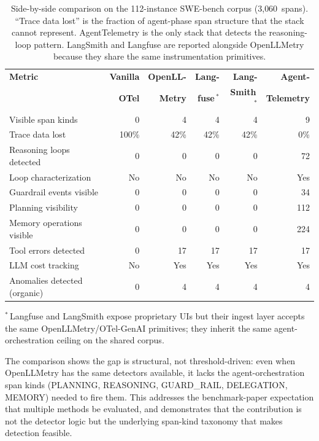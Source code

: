 \documentclass[sigconf,screen]{acmart}
\begin{document}
\begin{table}[t]
\centering
\scriptsize
\caption{Side-by-side comparison on the 112-instance SWE-bench corpus
(3{,}060~spans).  ``Trace data lost'' is the fraction of agent-phase
span structure that the stack cannot represent.  AgentTelemetry is the
only stack that detects the reasoning-loop pattern.  LangSmith and
Langfuse are reported alongside OpenLLMetry because they share the
same instrumentation primitives.}
\label{tab:headtohead}
\begin{tabular}{@{}lrrrrr@{}}
\toprule
\textbf{Metric} & \textbf{Vanilla} & \textbf{OpenLL-} & \textbf{Lang-} & \textbf{Lang-} & \textbf{Agent-} \\
                & \textbf{OTel}    & \textbf{Metry}   & \textbf{fuse}\,$^{\ast}$ & \textbf{Smith}\,$^{\ast}$ & \textbf{Telemetry} \\
\midrule
Visible span kinds                & 0    & 4    & 4    & 4    & 9    \\
Trace data lost                   & 100\% & 42\% & 42\% & 42\% & 0\%  \\
Reasoning loops detected          & 0    & 0    & 0    & 0    & 72   \\
Loop characterization             & No   & No   & No   & No   & Yes  \\
Guardrail events visible          & 0    & 0    & 0    & 0    & 34   \\
Planning visibility               & 0    & 0    & 0    & 0    & 112  \\
Memory operations visible         & 0    & 0    & 0    & 0    & 224  \\
Tool errors detected              & 0    & 17   & 17   & 17   & 17   \\
LLM cost tracking                 & No   & Yes  & Yes  & Yes  & Yes  \\
Anomalies detected (organic)      & 0    & 4    & 4    & 4    & 4    \\
\bottomrule
\end{tabular}
\par\smallskip\noindent\footnotesize
$^{\ast}$\,Langfuse and LangSmith expose proprietary UIs but their
ingest layer accepts the same OpenLLMetry/OTel-GenAI primitives; they
inherit the same agent-orchestration ceiling on the shared corpus.
\end{table}

The comparison shows the gap is structural, not threshold-driven: even
when OpenLLMetry has the same detectors available, it lacks the
agent-orchestration span kinds (PLANNING, REASONING, GUARD\_RAIL,
DELEGATION, MEMORY) needed to fire them.  This addresses the
benchmark-paper expectation that multiple methods be evaluated, and
demonstrates that the contribution is not the detector logic but the
underlying span-kind taxonomy that makes detection feasible.
\end{document}
